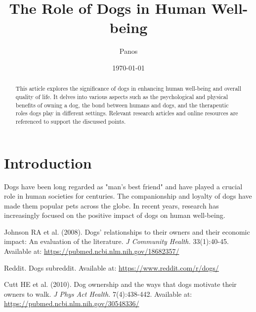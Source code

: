 \documentclass[twocolumn]{article}
\title{The Role of Dogs in Human Well-being}
\author{Panos}
\date{\today}
\begin{document}
\maketitle

\begin{abstract}
This article explores the significance of dogs in enhancing human well-being and overall quality of life. It delves into various aspects such as the psychological and physical benefits of owning a dog, the bond between humans and dogs, and the therapeutic roles dogs play in different settings. Relevant research articles and online resources are referenced to support the discussed points.
\end{abstract}

\section{Introduction}
Dogs have been long regarded as "man's best friend" and have played a crucial role in human societies for centuries. The companionship and loyalty of dogs have made them popular pets across the globe. In recent years, research has increasingly focused on the positive impact of dogs on human well-being.

\begin{thebibliography}{9}

 Johnson RA et al. (2008). Dogs’ relationships to their owners and their economic impact: An evaluation of the literature. \textit{J Community Health.} 33(1):40-45. Available at: \url{https://pubmed.ncbi.nlm.nih.gov/18682357/}

 Reddit. Dogs subreddit. Available at: \url{https://www.reddit.com/r/dogs/}

 Cutt HE et al. (2010). Dog ownership and the ways that dogs motivate their owners to walk. \textit{J Phys Act Health.} 7(4):438-442. Available at: \url{https://pubmed.ncbi.nlm.nih.gov/30548336/}

\end{thebibliography}
\end{document}
